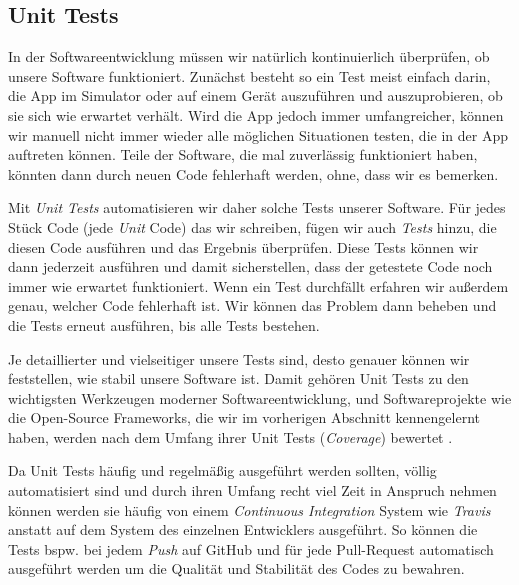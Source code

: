 \documentclass[parskip=half, final]{scrreprt}
\begin{document}
\begin{lecture}

\section{Unit Tests}

In der Softwareentwicklung müssen wir natürlich kontinuierlich überprüfen, ob unsere Software funktioniert. Zunächst besteht so ein Test meist einfach darin, die App im Simulator oder auf einem Gerät auszuführen und auszuprobieren, ob sie sich wie erwartet verhält. Wird die App jedoch immer umfangreicher, können wir manuell nicht immer wieder alle möglichen Situationen testen, die in der App auftreten können. Teile der Software, die mal zuverlässig funktioniert haben, könnten dann durch neuen Code fehlerhaft werden, ohne, dass wir es bemerken.

Mit \emph{Unit Tests} automatisieren wir daher solche Tests unserer Software. Für jedes Stück Code (jede \emph{Unit} Code) das wir schreiben, fügen wir auch \emph{Tests} hinzu, die diesen Code ausführen und das Ergebnis überprüfen. Diese Tests können wir dann jederzeit ausführen und damit sicherstellen, dass der getestete Code noch immer wie erwartet funktioniert. Wenn ein Test durchfällt erfahren wir außerdem genau, welcher Code fehlerhaft ist. Wir können das Problem dann beheben und die Tests erneut ausführen, bis alle Tests bestehen.

Je detaillierter und vielseitiger unsere Tests sind, desto genauer können wir feststellen, wie stabil unsere Software ist. Damit gehören Unit Tests zu den wichtigsten Werkzeugen moderner Softwareentwicklung, und Softwareprojekte wie die Open-Source Frameworks, die wir im vorherigen Abschnitt kennengelernt haben, werden nach dem Umfang ihrer Unit Tests (\emph{Coverage}) bewertet .

Da Unit Tests häufig und regelmäßig ausgeführt werden sollten, völlig automatisiert sind und durch ihren Umfang recht viel Zeit in Anspruch nehmen können werden sie häufig von einem \emph{Continuous Integration} System wie \emph{Travis} anstatt auf dem System des einzelnen Entwicklers ausgeführt. So können die Tests bspw. bei jedem \emph{Push} auf GitHub und für jede Pull-Request automatisch ausgeführt werden um die Qualität und Stabilität des Codes zu bewahren.

\begin{exc}


\end{exc}
\end{lecture}
\end{document}
